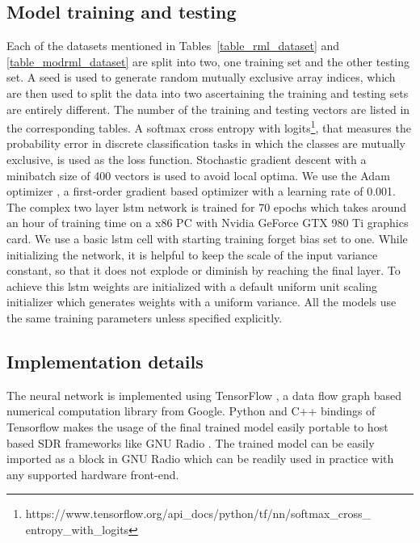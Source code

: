 \subsection{Model training and testing}
Each of the datasets mentioned in Tables~\ref{table_rml_dataset} and \ref{table_modrml_dataset} are split into two, one training set and the other testing set. A seed is used to generate random mutually exclusive array indices, which are then used to split the data into two ascertaining the training and testing sets are entirely different. The number of the training and testing vectors are listed in the corresponding tables. A softmax cross entropy with logits\footnote{https://www.tensorflow.org/api\_docs/python/tf/nn/softmax\_cross\_\\entropy\_with\_logits}, that measures the probability error in discrete classification tasks in which the classes are mutually exclusive, is used as the loss function. Stochastic gradient descent with a minibatch size of 400 vectors is used to avoid local optima. We use the Adam optimizer \cite{adam_optimizer}, a first-order gradient based optimizer with a learning rate of 0.001. The complex two layer \ac{lstm} network is trained for 70 epochs which takes around an hour of training time on a x86 PC with Nvidia GeForce GTX 980 Ti graphics card. We use a basic \ac{lstm} cell with starting training forget bias set to one. While initializing the network, it is helpful to keep the scale of the input variance constant, so that it does not explode or diminish by reaching the final layer. To achieve this \ac{lstm} weights are initialized with a default uniform unit scaling initializer which generates weights with a uniform variance. All the models use the same training parameters unless specified explicitly.


\subsection{Implementation details}\label{implementation}
The neural network is implemented using TensorFlow \cite{tensorflow}, a data flow graph based numerical computation library from Google. Python and C++ bindings of Tensorflow makes the usage of the final trained model easily portable to host based SDR frameworks like GNU Radio \cite{gnuradio_web}. The trained model can be easily imported as a block in GNU Radio which can be readily used in practice with any supported hardware front-end.